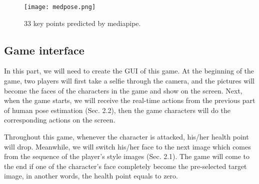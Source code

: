 \begin{figure}[ht]
    \centering
    \texttt{[image: medpose.png]}
    \caption{33 key points predicted by mediapipe.}
    \label{fig:medpose}
\end{figure}


\subsection{Game interface}

In this part, we will need to create the GUI of this game. At the beginning of the game, two players will first take a selfie through the camera, and the pictures will become the faces of the characters in the game and show on the screen. Next, when the game starts, we will receive the real-time actions from the previous part of human pose estimation (Sec. 2.2), then the game characters will do the corresponding actions on the screen.

Throughout this game, whenever the character is attacked, his/her health point will drop. Meanwhile, we will switch his/her face to the next image which comes from the sequence of the player's style images (Sec. 2.1). The game will come to the end if one of the character's face completely become the pre-selected target image, in another words, the health point equals to zero.